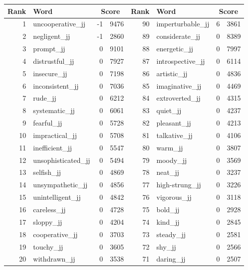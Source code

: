 \begin{table}[tbp]
    \begin{tabular}{| rlr@{.}l | rlr@{.}l |}
    \hline
    \textbf{Rank} & \textbf{Word} & \multicolumn{2}{c|}{\textbf{Score}} & \textbf{Rank} & \textbf{Word} & \multicolumn{2}{c|}{\textbf{Score}} \\
    \hline
    1 & uncooperative\_jj & -1 & 9476    &    90 & imperturbable\_jj & 6 & 3861 \\
    2 & negligent\_jj & -1 & 2860    &    89 & considerate\_jj & 0 & 8389 \\
    3 & prompt\_jj & 0 & 9101    &    88 & energetic\_jj & 0 & 7997 \\
    4 & distrustful\_jj & 0 & 7927    &    87 & introspective\_jj & 0 & 6114 \\
    5 & insecure\_jj & 0 & 7198    &    86 & artistic\_jj & 0 & 4836 \\
    6 & inconsistent\_jj & 0 & 7036    &    85 & imaginative\_jj & 0 & 4469 \\
    7 & rude\_jj & 0 & 6212    &    84 & extroverted\_jj & 0 & 4315 \\
    8 & systematic\_jj & 0 & 6061    &    83 & quiet\_jj & 0 & 4237 \\
    9 & fearful\_jj & 0 & 5728    &    82 & pleasant\_jj & 0 & 4213 \\
    10 & impractical\_jj & 0 & 5708    &    81 & talkative\_jj & 0 & 4106 \\
    11 & inefficient\_jj & 0 & 5547    &    80 & warm\_jj & 0 & 3807 \\
    12 & unsophisticated\_jj & 0 & 5494    &    79 & moody\_jj & 0 & 3569 \\
    13 & selfish\_jj & 0 & 4869    &    78 & neat\_jj & 0 & 3237 \\
    14 & unsympathetic\_jj & 0 & 4856    &    77 & high-strung\_jj & 0 & 3226 \\
    15 & unintelligent\_jj & 0 & 4842    &    76 & vigorous\_jj & 0 & 3118 \\
    16 & careless\_jj & 0 & 4728    &    75 & bold\_jj & 0 & 2928 \\
    17 & sloppy\_jj & 0 & 4204    &    74 & kind\_jj & 0 & 2845 \\
    18 & cooperative\_jj & 0 & 3703    &    73 & steady\_jj & 0 & 2581 \\
    19 & touchy\_jj & 0 & 3605    &    72 & shy\_jj & 0 & 2566 \\
    20 & withdrawn\_jj & 0 & 3538    &    71 & daring\_jj & 0 & 2507 \\

\end{tabular}
\end{table}
